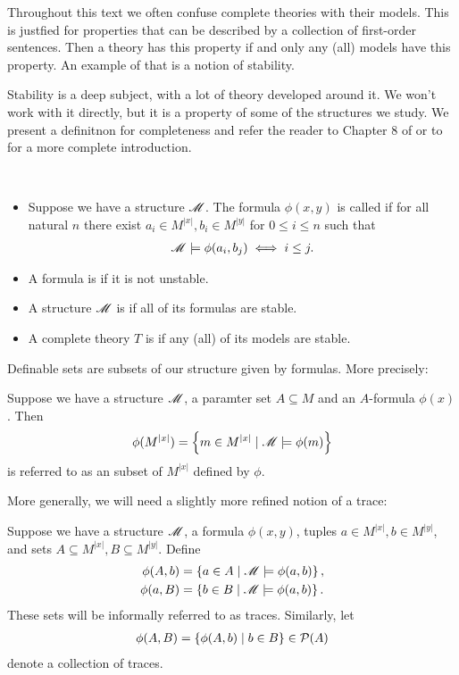 Throughout this text we often confuse complete theories with their models.
This is justfied for properties that can be described by a collection of first-order sentences.
Then a theory has this property if and only any (all) models have this property.
An example of that is a notion of stability.

Stability is a deep subject, with a lot of theory developed around it.
We won't work with it directly, but it is a property of some of the structures we study.
We present a definitnon for completeness and refer the reader to Chapter 8 of \cite{tent} or to \cite{pillay} for a more complete introduction.

\begin{Definition} \ 
  \begin{itemize}
  \item Suppose we have a structure $\mathscr M$.
    The formula $\phi(x,y)$ is called  if for all natural $n$
    there exist $a_i \in M^{|x|}, b_i \in M^{|y|}$ for $0 \leq i \leq n$ such that
    \begin{align*}
      \mathscr M \models \phi(a_i, b_j) \iff i \leq j.
    \end{align*}
  \item A formula is  if it is not unstable.
  \item A structure $\mathscr M$ is  if all of its formulas are stable.
  \item A complete theory $T$ is \defn{stable} if any (all) of its models are stable.
  \end{itemize}
\end{Definition}

Definable sets are subsets of our structure given by formulas.
More precisely:
\begin{Definition}
  Suppose we have a structure $\mathscr M$, a paramter set $A \subseteq M$ and an $A$-formula $\phi(x)$.
  Then 
  \begin{align*}
    \phi(M^{|x|}) = \left\{m \in M^{|x|} \mid \mathscr M \models \phi(m)\right\}
  \end{align*}
  is referred to as an  subset of $M^{|x|}$ defined by $\phi$.
\end{Definition}

More generally, we will need a slightly more refined notion of a trace:
\begin{Definition}
  Suppose we have a structure $\mathscr M$, a formula $\phi(x, y)$, tuples $a \in M^{|x|}, b \in M^{|y|}$, and
  sets $A \subseteq M^{|x|}, B \subseteq M^{|y|}$. 
  Define
  \begin{align*}
    \phi(A, b) &= \left\{a \in A \mid \mathscr M \models \phi(a,b)\right\}, \\
    \phi(a, B) &= \left\{b \in B \mid \mathscr M \models \phi(a,b)\right\}.
  \end{align*}
  These sets will be informally referred to as traces.
  Similarly, let
  \begin{align*}
    \phi(A, B) = \left\{\phi(A, b) \mid b \in B\right\} \in \mathcal P(A)
  \end{align*}
  denote a collection of traces.
\end{Definition}

